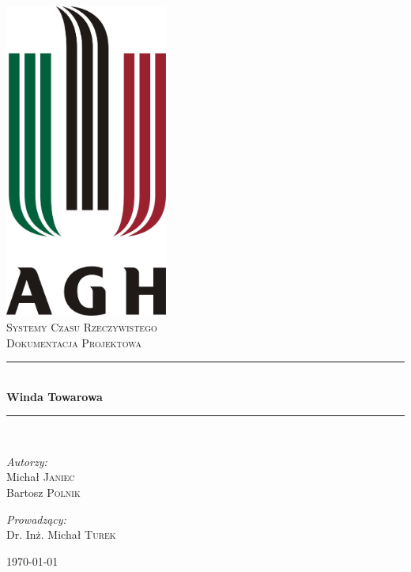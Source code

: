 \documentclass[a4paper,11pt]{article}
\newcommand{\HRule}{\rule{\linewidth}{0.5mm}}
\begin{document}
\begin{titlepage}
    \begin{center}
        \includegraphics[width=0.4\textwidth]{images/logo.jpg} \\[1cm]
        \textsc{\LARGE Systemy Czasu Rzeczywistego} \\[0.8cm]
        \textsc{\LARGE Dokumentacja Projektowa} \\[0.5cm]
        \HRule \\[0.4cm]
        { \huge \bfseries Winda Towarowa} \\[0.4cm]
        \HRule \\[1.5cm]
    
    \begin{minipage}{0.4\textwidth}
        \begin{flushleft} \large
        \emph{Autorzy:} \\
        Michał \textsc{Janiec} \\
        Bartosz \textsc{Polnik}
        \end{flushleft}
    \end{minipage}
    \begin{minipage}{0.4\textwidth}
        \begin{flushright} \large
            \emph{Prowadzący:} \\
            Dr. Inż. Michał \textsc{Turek}
        \end{flushright}
    \end{minipage}

    \vfill

    {\large \today}

    \end{center}
\end{titlepage}
\end{document}
